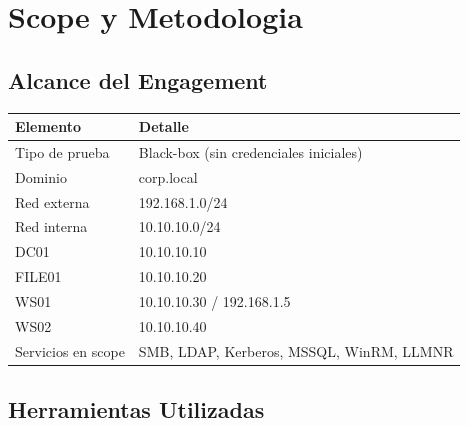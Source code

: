 \documentclass[11pt,a4paper]{article}
\begin{document}
\newpage

\section{Scope y Metodologia}

\subsection{Alcance del Engagement}

\begin{center}
\begin{tabularx}{\textwidth}{lX}
\toprule
\textbf{Elemento} & \textbf{Detalle} \\
\midrule
Tipo de prueba     & Black-box (sin credenciales iniciales) \\
Dominio            & corp.local \\
Red externa        & 192.168.1.0/24 \\
Red interna        & 10.10.10.0/24 \\
DC01               & 10.10.10.10 \\
FILE01             & 10.10.10.20 \\
WS01               & 10.10.10.30 / 192.168.1.5 \\
WS02               & 10.10.10.40 \\
Servicios en scope & SMB, LDAP, Kerberos, MSSQL, WinRM, LLMNR \\
\bottomrule
\end{tabularx}
\end{center}

\subsection{Herramientas Utilizadas}
\end{document}
